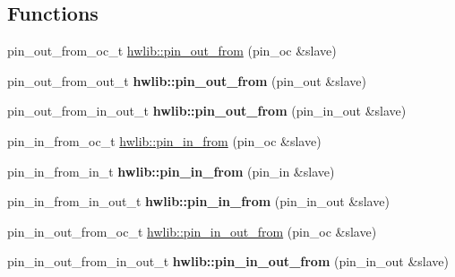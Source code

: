 \subsection*{Functions}
\textbf{ }\par
\begin{DoxyCompactItemize}
\item 
pin\+\_\+out\+\_\+from\+\_\+oc\+\_\+t \hyperlink{namespacehwlib_aa1e6aac16c5ac14715e165b463ec6a46}{hwlib\+::pin\+\_\+out\+\_\+from} (pin\+\_\+oc \&slave)
\item 
\mbox{\label{namespacehwlib_a3ce4337cbc4610752785a8766a72dde4}} 
pin\+\_\+out\+\_\+from\+\_\+out\+\_\+t {\bfseries hwlib\+::pin\+\_\+out\+\_\+from} (pin\+\_\+out \&slave)
\item 
\mbox{\label{namespacehwlib_ae26ee7675d8c8a2b220365498c66f6d1}} 
pin\+\_\+out\+\_\+from\+\_\+in\+\_\+out\+\_\+t {\bfseries hwlib\+::pin\+\_\+out\+\_\+from} (pin\+\_\+in\+\_\+out \&slave)
\end{DoxyCompactItemize}

\textbf{ }\par
\begin{DoxyCompactItemize}
\item 
pin\+\_\+in\+\_\+from\+\_\+oc\+\_\+t \hyperlink{namespacehwlib_a2f8ff4c157c60783c37db6bb1e11e3a4}{hwlib\+::pin\+\_\+in\+\_\+from} (pin\+\_\+oc \&slave)
\item 
\mbox{\label{namespacehwlib_a1efeb96ba608232c2452645704c83160}} 
pin\+\_\+in\+\_\+from\+\_\+in\+\_\+t {\bfseries hwlib\+::pin\+\_\+in\+\_\+from} (pin\+\_\+in \&slave)
\item 
\mbox{\label{namespacehwlib_afff5475ce3317d8ad97933a611f33ea3}} 
pin\+\_\+in\+\_\+from\+\_\+in\+\_\+out\+\_\+t {\bfseries hwlib\+::pin\+\_\+in\+\_\+from} (pin\+\_\+in\+\_\+out \&slave)
\end{DoxyCompactItemize}

\textbf{ }\par
\begin{DoxyCompactItemize}
\item 
pin\+\_\+in\+\_\+out\+\_\+from\+\_\+oc\+\_\+t \hyperlink{namespacehwlib_ab2c0c1d086f745d266ad2d247187f65f}{hwlib\+::pin\+\_\+in\+\_\+out\+\_\+from} (pin\+\_\+oc \&slave)
\item 
\mbox{\label{namespacehwlib_ac4fd92daeafd41d14e6c907195014a21}} 
pin\+\_\+in\+\_\+out\+\_\+from\+\_\+in\+\_\+out\+\_\+t {\bfseries hwlib\+::pin\+\_\+in\+\_\+out\+\_\+from} (pin\+\_\+in\+\_\+out \&slave)
\end{DoxyCompactItemize}

